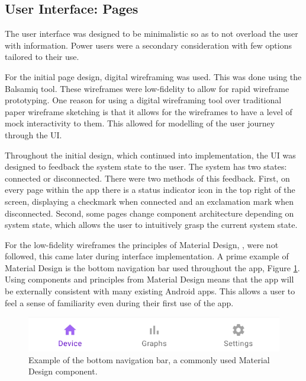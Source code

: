 \documentclass{l4proj}
\begin{document}
\subsection{User Interface: Pages}

The user interface was designed to be minimalistic so as to not overload the user with information. Power users were a secondary consideration with few options tailored to their use.

For the initial page design, digital wireframing was used. This was done using the Balsamiq \citep{balsamiq_balsamiq_2021} tool. These wireframes were low-fidelity to allow for rapid wireframe prototyping. One reason for using a digital wireframing tool over traditional paper wireframe sketching is that it allows for the wireframes to have a level of mock interactivity to them. This allowed for modelling of the user journey through the UI.

Throughout the initial design, which continued into implementation, the UI was designed to feedback the system state to the user. The system has two states: connected or disconnected. There were two methods of this feedback. First, on every page within the app there is a status indicator icon in the top right of the screen, displaying a checkmark when connected and an exclamation mark when disconnected. Second, some pages change component architecture depending on system state, which allows the user to intuitively grasp the current system state.

For the low-fidelity wireframes the principles of Material Design, \citep{google_design_nodate}, were not followed, this came later during interface implementation. A prime example of Material Design is the bottom navigation bar used throughout the app, Figure \ref{fig:bottom_nav}. Using components and principles from Material Design means that the app will be externally consistent with many existing Android apps. This allows a user to feel a sense of familiarity even during their first use of the app.

\begin{figure}[!htb]
    \centering
    \includegraphics[width=0.7\linewidth]{images/bottom_nav.png}

    \caption{ Example of the bottom navigation bar, a commonly used Material Design component.  }

    \label{fig:bottom_nav}
\end{figure}
\end{document}
